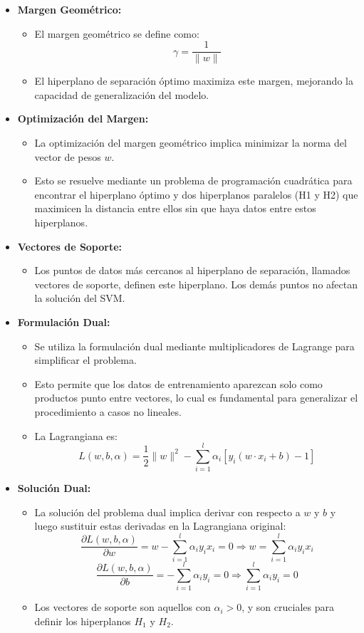 \begin{itemize}
\item \textbf{Margen Geométrico:}
\begin{itemize}
	\item El margen geométrico se define como:
	\[
	\gamma = \frac{1}{\|w\|}
	\]
	\item El hiperplano de separación óptimo maximiza este margen, mejorando la capacidad de generalización del modelo.
\end{itemize}

\item \textbf{Optimización del Margen:}
\begin{itemize}
	\item La optimización del margen geométrico implica minimizar la norma del vector de pesos \( w \).
	\item Esto se resuelve mediante un problema de programación cuadrática para encontrar el hiperplano óptimo y dos hiperplanos paralelos (H1 y H2) que maximicen la distancia entre ellos sin que haya datos entre estos hiperplanos.
\end{itemize}

\item \textbf{Vectores de Soporte:}
\begin{itemize}
	\item Los puntos de datos más cercanos al hiperplano de separación, llamados vectores de soporte, definen este hiperplano. Los demás puntos no afectan la solución del SVM.
\end{itemize}

\item \textbf{Formulación Dual:}
\begin{itemize}
	\item Se utiliza la formulación dual mediante multiplicadores de Lagrange para simplificar el problema.
	\item Esto permite que los datos de entrenamiento aparezcan solo como productos punto entre vectores, lo cual es fundamental para generalizar el procedimiento a casos no lineales.
	\item La Lagrangiana es:
	\[
	L(w, b, \alpha) = \frac{1}{2} \|w\|^2 - \sum_{i=1}^{l} \alpha_i \left[ y_i \left( w \cdot x_i + b \right) - 1 \right]
	\]
\end{itemize}

\item \textbf{Solución Dual:}
\begin{itemize}
	\item La solución del problema dual implica derivar con respecto a \( w \) y \( b \) y luego sustituir estas derivadas en la Lagrangiana original:
	\[
	\frac{\partial L(w, b, \alpha)}{\partial w} = w - \sum_{i=1}^{l} \alpha_i y_i x_i = 0 \Rightarrow w = \sum_{i=1}^{l} \alpha_i y_i x_i
	\]
	\[        \frac{\partial L(w, b, \alpha)}{\partial b} = - \sum_{i=1}^{l} \alpha_i y_i = 0 \Rightarrow \sum_{i=1}^{l} \alpha_i y_i = 0        \]
	\item Los vectores de soporte son aquellos con \( \alpha_i > 0 \), y son cruciales para definir los hiperplanos \( H_1 \) y \( H_2 \).
\end{itemize}
\end{itemize}
